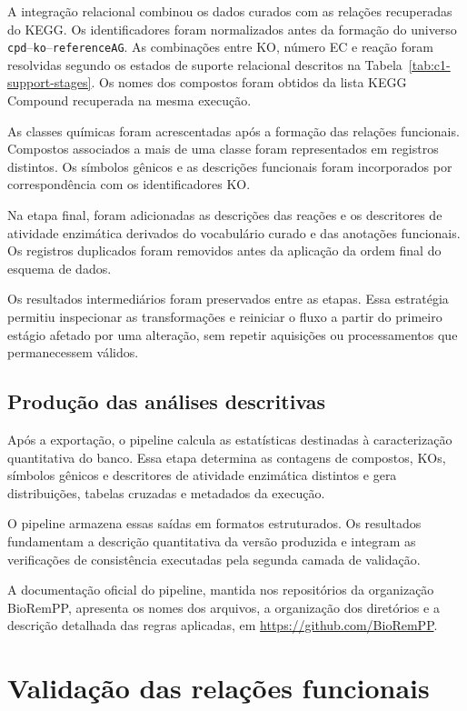 A integração relacional combinou os dados curados com as relações recuperadas
do KEGG. Os identificadores foram normalizados antes da formação do universo
\texttt{cpd}--\texttt{ko}--\texttt{referenceAG}. As combinações entre KO,
número EC e reação foram resolvidas segundo os estados de suporte relacional
descritos na Tabela~\ref{tab:c1-support-stages}. Os nomes dos compostos foram
obtidos da lista KEGG Compound recuperada na mesma execução.

As classes químicas foram acrescentadas após a formação das relações
funcionais. Compostos associados a mais de uma classe foram representados em
registros distintos. Os símbolos gênicos e as descrições funcionais foram
incorporados por correspondência com os identificadores KO.

Na etapa final, foram adicionadas as descrições das reações e os descritores de
atividade enzimática derivados do vocabulário curado e das anotações
funcionais. Os registros duplicados foram removidos antes da aplicação da
ordem final do esquema de dados.

Os resultados intermediários foram preservados entre as etapas. Essa
estratégia permitiu inspecionar as transformações e reiniciar o fluxo a partir
do primeiro estágio afetado por uma alteração, sem repetir aquisições ou
processamentos que permanecessem válidos.

\subsection{Produção das análises descritivas}

Após a exportação, o pipeline calcula as estatísticas destinadas à
caracterização quantitativa do banco. Essa etapa determina as contagens de
compostos, KOs, símbolos gênicos e descritores de atividade enzimática
distintos e gera distribuições, tabelas cruzadas e metadados da execução.

O pipeline armazena essas saídas em formatos estruturados. Os resultados
fundamentam a descrição quantitativa da versão produzida e integram as
verificações de consistência executadas pela segunda camada de validação. 

A documentação oficial do pipeline, mantida nos repositórios da organização
BioRemPP, apresenta os nomes dos arquivos, a organização dos diretórios e a
descrição detalhada das regras aplicadas, em
\url{https://github.com/BioRemPP}.

\section{Validação das relações funcionais}
\label{sec:c1-validacao-kegg}

